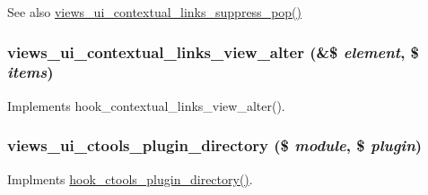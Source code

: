 \begin{DoxySeeAlso}{See also}
\hyperlink{views__ui_8module_ab6dfabb5c82c088831c6ef269c39b4db}{views\_\-ui\_\-contextual\_\-links\_\-suppress\_\-pop()} 
\end{DoxySeeAlso}
\hypertarget{views__ui_8module_a5b9dd769ef8a18413dcf7b3342779947}{
\subsubsection[{views\_\-ui\_\-contextual\_\-links\_\-view\_\-alter}]{\setlength{\rightskip}{0pt plus 5cm}views\_\-ui\_\-contextual\_\-links\_\-view\_\-alter (\&\$ {\em element}, \/  \$ {\em items})}}
\label{views__ui_8module_a5b9dd769ef8a18413dcf7b3342779947}
Implements hook\_\-contextual\_\-links\_\-view\_\-alter(). \hypertarget{views__ui_8module_abc525dd2fcbb81c7499c9df4828e902b}{
\subsubsection[{views\_\-ui\_\-ctools\_\-plugin\_\-directory}]{\setlength{\rightskip}{0pt plus 5cm}views\_\-ui\_\-ctools\_\-plugin\_\-directory (\$ {\em module}, \/  \$ {\em plugin})}}
\label{views__ui_8module_abc525dd2fcbb81c7499c9df4828e902b}
Implments \hyperlink{group__hooks_gaf17a0de7a7ca6e6c30c766ea1e44715e}{hook\_\-ctools\_\-plugin\_\-directory()}.

